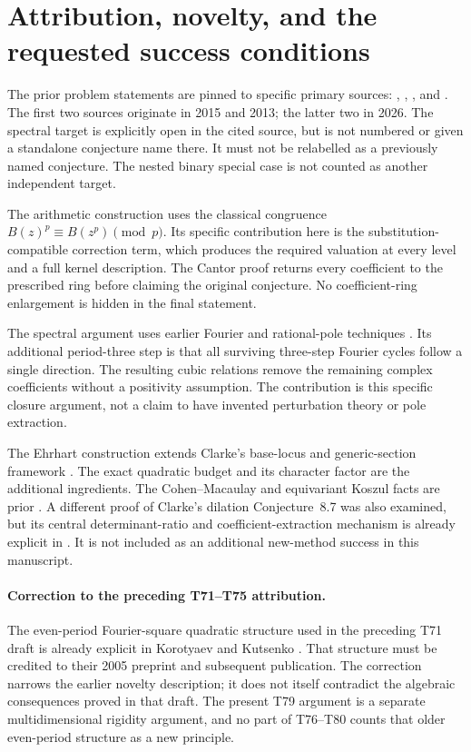 \documentclass[11pt,a4paper]{article}
\theoremstyle{definition}
\theoremstyle{remark}\newtheorem{remark}[lemma]{Remark}
\begin{document}
\section{Attribution, novelty, and the requested success conditions}
\label{sec:historical-audit}

The prior problem statements are pinned to specific primary sources:
\cite[Conjecture~4]{KMp}, \cite[Conjecture~12]{KM3},
\cite[Section~4.4]{CFK}, and \cite[Conjecture~8.5]{Clarke26}.
The first two sources originate in 2015 and 2013; the latter two in 2026.
The spectral target is explicitly open in the cited source, but is not
numbered or given a standalone conjecture name there. It must not be
relabelled as a previously named conjecture. The nested binary special case
\cite[Conjecture~4]{KKM2} is not counted as another independent target.

The arithmetic construction uses the classical congruence
$B(z)^p\equiv B(z^p)\pmod p$. Its specific contribution here is the
substitution-compatible correction term, which produces the required
valuation at every level and a full kernel description. The Cantor proof
returns every coefficient to the prescribed ring before claiming the
original conjecture. No coefficient-ring enlargement is hidden in the
final statement.

The spectral argument uses earlier Fourier and rational-pole techniques
\cite{Liu23}. Its additional period-three step is that all surviving
three-step Fourier cycles follow a single direction. The resulting cubic
relations remove the remaining complex coefficients without a positivity
assumption. The contribution is this specific closure argument, not a claim
to have invented perturbation theory or pole extraction.

The Ehrhart construction extends Clarke's base-locus and generic-section
framework \cite{Clarke26}. The exact quadratic budget and its character
factor are the additional ingredients. The Cohen--Macaulay and equivariant
Koszul facts are prior \cite{Hochster72,Stapledon24}. A different proof of
Clarke's dilation Conjecture~8.7 was also examined, but its central
determinant-ratio and coefficient-extraction mechanism is already explicit
in \cite[Section~2.5, equation~(7), and Lemma~2.33]{Stapledon24}. It is not
included as an additional new-method success in this manuscript.

\paragraph{Correction to the preceding T71--T75 attribution.}
The even-period Fourier-square quadratic structure used in the preceding
T71 draft is already explicit in Korotyaev and Kutsenko
\cite[Theorem~2.4, Lemma~2.6, and equation~(2.31)]{KK05}.
That structure must be credited to their 2005 preprint and subsequent
publication. The correction narrows the earlier novelty description; it
does not itself contradict the algebraic consequences proved in that draft.
The present T79 argument is a separate multidimensional rigidity argument,
and no part of T76--T80 counts that older even-period structure as a new
principle.
\end{document}
